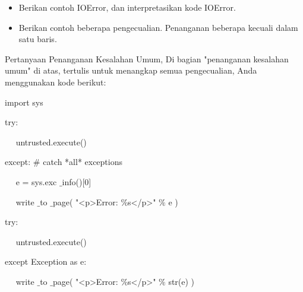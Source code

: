 \begin{itemize}
\item Berikan contoh IOError, dan interpretasikan kode IOError. 

\item Berikan contoh beberapa pengecualian. Penanganan beberapa kecuali dalam satu baris.\end{itemize}
 
 
\vspace{12pt}

Pertanyaan Penanganan Kesalahan Umum, Di bagian "penanganan kesalahan umum" di atas, tertulis untuk menangkap semua pengecualian, Anda menggunakan kode berikut: 
\vspace{14pt}
 
{\fontsize{10pt}{10pt}\selectfont import sys} 


{\fontsize{10pt}{10pt}\selectfont  try:} 

\vspace{10pt}
 

{\fontsize{10pt}{10pt}\selectfont ~~ untrusted.execute()} 

\vspace{10pt}


{\fontsize{10pt}{10pt}\selectfont  except:  $  \#  $ catch *all* exceptions} 

\vspace{10pt}


{\fontsize{10pt}{10pt}\selectfont ~~ e = sys.exc $  \_  $info()[0]} 

\vspace{10pt}


{\fontsize{10pt}{10pt}\selectfont ~~ write $  \_  $to $  \_  $page( "<p>Error:  $  \%  $s</p>"  $  \%  $ e )} 
\vspace{16pt}


{\fontsize{10pt}{10pt}\selectfont  try:}

\vspace{10pt}
 
 
{\fontsize{10pt}{10pt}\selectfont ~~ untrusted.execute()} 

\vspace{10pt}

 
{\fontsize{10pt}{10pt}\selectfont  except Exception as e:} 

\vspace{10pt}

 
{\fontsize{10pt}{10pt}\selectfont ~~ write $  \_  $to $  \_  $page( "<p>Error:  $  \%  $s</p>"  $  \%  $ str(e) )} 
\vspace{16pt}

